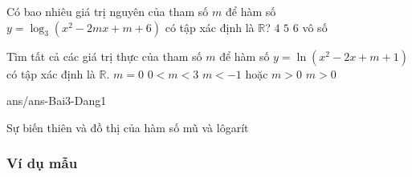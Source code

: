 \begin{ex}
	Có bao nhiêu giá trị nguyên của tham số $m$ để hàm số $y=\log_3(x^2-2mx+m+6)$ có tập xác định là $\mathbb{R}$?
	\choice
	{\True $4$}
	{$5$}
	{$6$}
	{vô số}
\end{ex}



\begin{ex}
	Tìm tất cả các giá trị thực của tham số $m$ để hàm số $y = \ln (x^2 - 2x + m + 1) $ có tập xác định là $\mathbb{R}$.
	\choice
	{$m = 0$}
	{$0<m<3$}
	{$m < -1$ hoặc $m > 0$}
	{\True $m > 0$}
\end{ex}

\begin{indapan}{10}
	{ans/ans-Bai3-Dang1}
\end{indapan}


\begin{dang}{Sự biến thiên và đồ thị của hàm số mũ và lôgarít}
	
\end{dang}

\subsubsection{Ví dụ mẫu}

